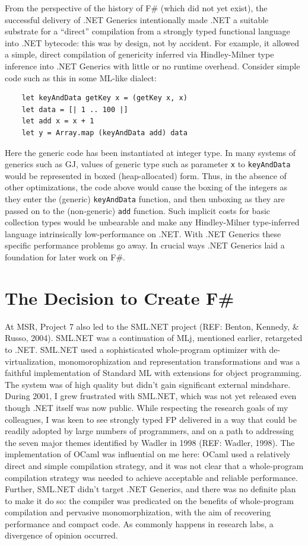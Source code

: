 \documentclass[acmsmall]{acmart}\settopmatter{}
\begin{document}
From the perspective of the history of F\# (which did not yet exist), the successful delivery of .NET Generics intentionally made .NET a suitable substrate
for a “direct” compilation from a strongly typed functional language into .NET bytecode: this was by design, not by accident. For example, it allowed a simple, direct
compilation of genericity inferred via Hindley-Milner type inference into .NET Generics with little or no runtime overhead.  Consider simple code such as this in some ML-like dialect:
\begin{verbatim}
    let keyAndData getKey x = (getKey x, x)
    let data = [| 1 .. 100 |]
    let add x = x + 1
    let y = Array.map (keyAndData add) data
\end{verbatim}

Here the generic code has been instantiated at integer type. In many systems of generics such as GJ, values of generic type such as
parameter \texttt{x} to \texttt{keyAndData} would be represented in boxed (heap-allocated) form.  Thus, in the absence of other optimizations, the code
above would cause the boxing of the integers as they enter the (generic) \texttt{keyAndData} function, and then unboxing as they are passed on
to the (non-generic) \texttt{add} function.  Such implicit costs for basic collection types would be unbearable and make any Hindley-Milner type-inferred language
intrinsically low-performance on .NET. With .NET Generics these specific performance problems go away.  In crucial ways .NET Generics laid a foundation for later work on F\#.


\section*{The Decision to Create F\#}

At MSR, Project 7 also led to the SML.NET project (REF: Benton, Kennedy, \& Russo, 2004).  SML.NET was a continuation of MLj, mentioned earlier, retargeted to
.NET.  SML.NET used a sophisticated whole-program optimizer with de-virtualization, monomorophization and representation transformations and was a faithful implementation of Standard ML
with extensions for object programming. The system was of high quality but didn’t gain significant external mindshare.   During 2001, I grew frustrated with SML.NET,
which was not yet released even though .NET itself was now public. While respecting the research goals of my colleagues, I was keen to see strongly typed FP delivered
in a way that could be readily adopted by large numbers of programmers, and on a path to addressing the seven major themes identified by Wadler in 1998 (REF: Wadler, 1998).  The
implementation of OCaml was influential on me here: OCaml used a relatively direct and simple compilation strategy, and it was not clear that a whole-program
compilation strategy was needed to achieve acceptable and reliable performance.  Further, SML.NET didn’t target .NET Generics, and there was no definite plan to
make it do so: the compiler was predicated on the benefits of whole-program compilation and pervasive monomorphization, with the aim of recovering performance
and compact code.  As commonly happens in research labs, a divergence of opinion occurred.
\end{document}
